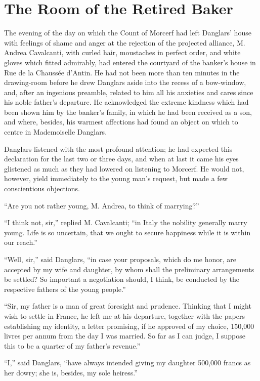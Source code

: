 \chapter{The Room of the Retired Baker}

The evening of the day on which the Count of Morcerf had left Danglars’
house with feelings of shame and anger at the rejection of the
projected alliance, M. Andrea Cavalcanti, with curled hair, moustaches
in perfect order, and white gloves which fitted admirably, had entered
the courtyard of the banker’s house in Rue de la Chaussée d’Antin. He
had not been more than ten minutes in the drawing-room before he drew
Danglars aside into the recess of a bow-window, and, after an ingenious
preamble, related to him all his anxieties and cares since his noble
father’s departure. He acknowledged the extreme kindness which had been
shown him by the banker’s family, in which he had been received as a
son, and where, besides, his warmest affections had found an object on
which to centre in Mademoiselle Danglars.

Danglars listened with the most profound attention; he had expected
this declaration for the last two or three days, and when at last it
came his eyes glistened as much as they had lowered on listening to
Morcerf. He would not, however, yield immediately to the young man’s
request, but made a few conscientious objections.

“Are you not rather young, M. Andrea, to think of marrying?”

“I think not, sir,” replied M. Cavalcanti; “in Italy the nobility
generally marry young. Life is so uncertain, that we ought to secure
happiness while it is within our reach.”

“Well, sir,” said Danglars, “in case your proposals, which do me honor,
are accepted by my wife and daughter, by whom shall the preliminary
arrangements be settled? So important a negotiation should, I think, be
conducted by the respective fathers of the young people.”

“Sir, my father is a man of great foresight and prudence. Thinking that
I might wish to settle in France, he left me at his departure, together
with the papers establishing my identity, a letter promising, if he
approved of my choice, 150,000 livres per annum from the day I was
married. So far as I can judge, I suppose this to be a quarter of my
father’s revenue.”

“I,” said Danglars, “have always intended giving my daughter 500,000
francs as her dowry; she is, besides, my sole heiress.”

